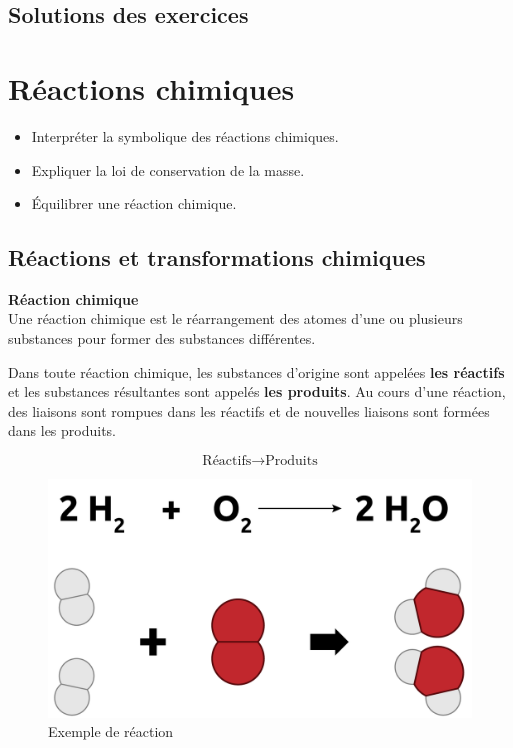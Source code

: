 \documentclass[
  11pt,
  a4paper,
  openany]{book}
\providecommand{\tightlist}{%
  \setlength{\itemsep}{0pt}\setlength{\parskip}{0pt}}
\begin{document}
\newpage

\section{Solutions des exercices} \shipoutAnswer

\hypertarget{ruxe9actions-chimiques}{%
\chapter{Réactions chimiques}\label{ruxe9actions-chimiques}}

\begin{objectives}

\begin{itemize}
\tightlist
\item
  Interpréter la symbolique des réactions chimiques.
\item
  Expliquer la loi de conservation de la masse.
\item
  Équilibrer une réaction chimique.
\end{itemize}

\end{objectives}

\hypertarget{ruxe9actions-et-transformations-chimiques}{%
\section{Réactions et transformations chimiques}\label{ruxe9actions-et-transformations-chimiques}}

\begin{tcolorbox}
\textbf{Réaction chimique}\\
Une réaction chimique est le réarrangement des atomes d'une ou plusieurs substances pour former des substances différentes.

\end{tcolorbox}

Dans toute réaction chimique, les substances d'origine sont appelées \textbf{les réactifs} et les substances résultantes sont appelés \textbf{les produits}. Au cours d'une réaction, des liaisons sont rompues dans les réactifs et de nouvelles liaisons sont formées dans les produits.

\[ \text{Réactifs} \longrightarrow \text{Produits} \]

\begin{figure}

{\centering \includegraphics[width=0.45\linewidth]{images/reactions-1} 

}

\caption{Exemple de réaction}\label{fig:reactions-1}
\end{figure}
\end{document}
